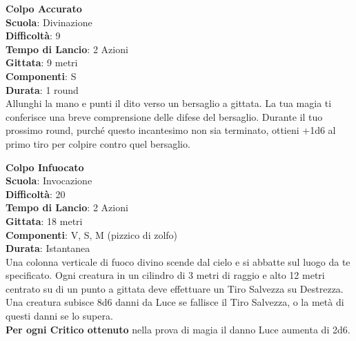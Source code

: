 \begin{multicols}{2}
\medskip\textbf{Colpo Accurato}\\
\textbf{Scuola}: Divinazione\\
\textbf{Difficoltà}:  9\\
\textbf{Tempo di Lancio}: 2 Azioni\\
\textbf{Gittata}: 9 metri\\
\textbf{Componenti}: S\\
\textbf{Durata}: 1 round\\
Allunghi la mano e punti il dito verso un bersaglio a gittata. La tua magia ti conferisce una breve comprensione delle difese del bersaglio. Durante il tuo prossimo round, purché questo incantesimo non sia terminato, ottieni +1d6 al primo tiro per colpire contro quel bersaglio.

\medskip\textbf{Colpo Infuocato}\\
\textbf{Scuola}: Invocazione\\
\textbf{Difficoltà}:  20\\
\textbf{Tempo di Lancio}: 2 Azioni\\
\textbf{Gittata}: 18 metri\\
\textbf{Componenti}: V, S, M (pizzico di zolfo)\\
\textbf{Durata}: Istantanea\\
Una colonna verticale di fuoco divino scende dal cielo e si abbatte sul luogo da te specificato. Ogni creatura in un cilindro di 3 metri di raggio e alto 12 metri centrato su di un punto a gittata deve effettuare un Tiro Salvezza su Destrezza. Una creatura subisce 8d6 danni da Luce se fallisce il Tiro Salvezza, o la metà di questi danni se lo supera.\\
\textbf{Per ogni Critico ottenuto} nella prova di magia il danno Luce aumenta di 2d6.


\end{multicols}
